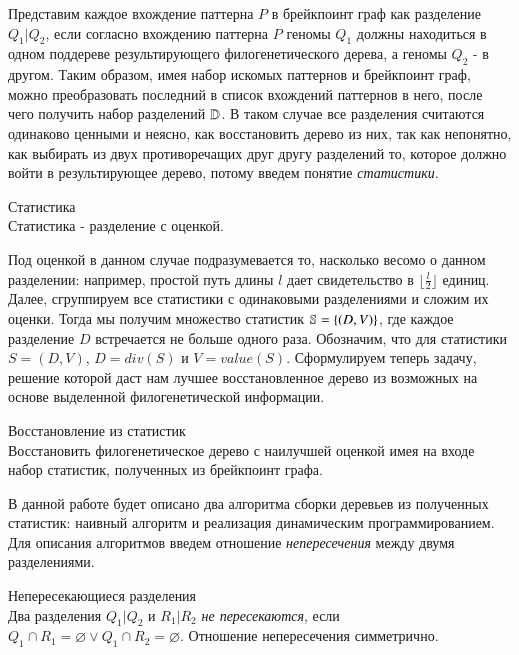 Представим каждое вхождение паттерна $P$ в брейкпоинт граф как разделение $Q_1|Q_2$,
если согласно вхождению паттерна $P$ геномы $Q_1$ должны находиться в одном поддереве результирующего филогенетического дерева,
а геномы $Q_2$ - в другом.
Таким образом, имея набор искомых паттернов и брейкпоинт граф, можно преобразовать последний в список вхождений паттернов в него,
после чего получить набор разделений $\mathbb{D}$.
В таком случае все разделения считаются одинаково ценными и неясно, как восстановить дерево из них, так как непонятно,
как выбирать из двух противоречащих друг другу разделений то, которое должно войти в результирующее дерево,
потому введем понятие \textit{статистики}.
\begin{define}{Статистика}\\
  Статистика - разделение с оценкой.
\end{define}
Под оценкой в данном случае подразумевается то, насколько весомо  о данном разделении:
например, простой путь длины $l$ дает свидетельство в $\lfloor\frac{l}{2}\rfloor$ единиц.
Далее, сгруппируем все статистики с одинаковыми разделениями и сложим их оценки.
Тогда мы получим множество статистик $\mathbb{S} = \{(D, V)\}$, где каждое разделение $D$ встречается не больше одного раза.
Обозначим, что для статистики $S = (D, V)$, $D = div(S)$ и $V = value(S)$.
Сформулируем теперь задачу, решение которой даст нам лучшее восстановленное дерево из возможных на основе выделенной филогенетической информации.
\begin{task}{Восстановление из статистик} \\
  Восстановить филогенетическое дерево с наилучшей оценкой имея на входе набор статистик,
  полученных из брейкпоинт графа.
\end{task}

В данной работе будет описано два алгоритма сборки деревьев из полученных статистик:
наивный алгоритм и реализация динамическим программированием.
Для описания алгоритмов введем отношение \textit{непересечения} между двумя разделениями.
\begin{define}{Непересекающиеся разделения} \\
  Два разделения $Q_1|Q_2$ и $R_1|R_2$ \textit{не пересекаются},
  если $Q_1 \cap R_1 = \varnothing \lor Q_1 \cap R_2 = \varnothing $.
  Отношение непересечения симметрично.
\end{define}

